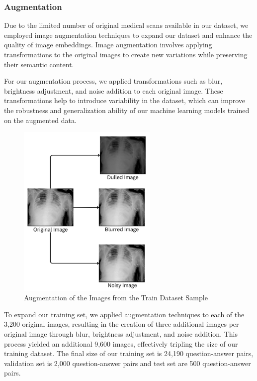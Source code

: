 \documentclass[pdflatex,sn-mathphys-num]{sn-jnl}%
\begin{document}
\subsubsection{Augmentation}\label{subsubsec3.1.1}
Due to the limited number of original medical scans available in our dataset, we employed image augmentation techniques to expand our dataset and enhance the quality of image embeddings. Image augmentation involves applying transformations to the original images to create new variations while preserving their semantic content.

For our augmentation process, we applied transformations such as blur, brightness adjustment, and noise addition to each original image. These transformations help to introduce variability in the dataset, which can improve the robustness and generalization ability of our machine learning models trained on the augmented data.

\begin{figure}[h]
\includegraphics[width=0.6\textwidth]{figs/augmentation.png}
\caption{Augmentation of the Images from the Train Dataset Sample}
\centering
\end{figure}

To expand our training set, we applied augmentation techniques to each of the 3,200 original images, resulting in the creation of three additional images per original image through blur, 
brightness adjustment, and noise addition. This process yielded an additional 9,600 images, effectively tripling the size of our training dataset. The final size of our training set is 24,190 question-answer pairs, validation set is 2,000 question-answer pairs and test set are 500 question-answer pairs.
\end{document}
